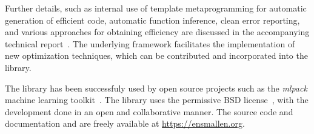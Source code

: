 \documentclass[twoside,11pt]{article}
\begin{document}
Further details, such as internal use of template metaprogramming
for automatic generation of efficient code, automatic function inference,
clean error reporting, and various approaches for obtaining efficiency
are discussed in the accompanying technical report~\citep{ensmallen2020}.
The underlying framework facilitates the implementation of new optimization techniques,
which can be contributed and incorporated into the library.

The library has been successfuly used by open source projects
such as the {\it mlpack} machine learning toolkit~\citep{mlpack2018}.
The library uses the permissive BSD license~\citep{Laurent_2008},
with the development done in an open and collaborative manner.
The source code and documentation and are freely available at \mbox{\url{https://ensmallen.org}}.



\end{document}
